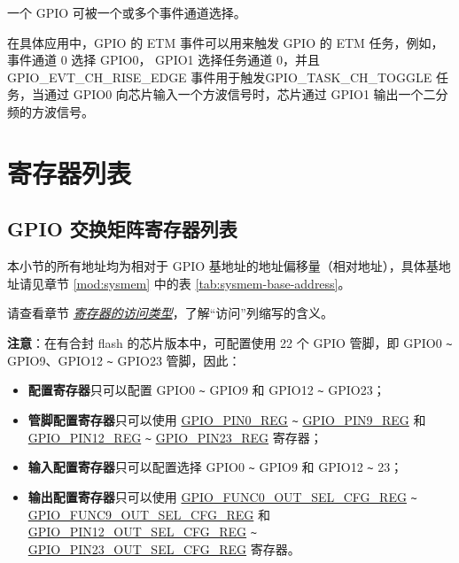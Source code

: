 \documentclass[main\_\_CN.tex]{subfiles}
\begin{document}
\begin{tiplisting}
一个 GPIO 可被一个或多个事件通道选择。
\end{tiplisting}

在具体应用中，GPIO 的 ETM 事件可以用来触发 GPIO 的 ETM 任务，例如，事件通道 0 选择 GPIO0， GPIO1 选择任务通道 0，并且 GPIO\_EVT\_CH\_RISE\_EDGE 事件用于触发GPIO\_TASK\_CH\_TOGGLE 任务，当通过 GPIO0 向芯片输入一个方波信号时，芯片通过 GPIO1 输出一个二分频的方波信号。












\hypertarget{iomuxgpio-reg-summ}{}
\section{寄存器列表}
\subsection{GPIO 交换矩阵寄存器列表}
本小节的所有地址均为相对于 GPIO 基地址的地址偏移量（相对地址），具体基地址请见章节 \ref{mod:sysmem} \textit{} 中的表 \ref{tab:sysmem-base-address}。

请查看章节 \hyperref[glossary-access-types]{\textit{寄存器的访问类型}}，了解“访问”列缩写的含义。


\textbf{注意}：在有合封 flash 的芯片版本中，可配置使用 22 个 GPIO 管脚，即 GPIO0 \verb+~+ GPIO9、GPIO12 \verb+~+ GPIO23 管脚，因此：
\begin{itemize}
    \item \textbf{配置寄存器}只可以配置 GPIO0 \verb+~+ GPIO9 和 GPIO12 \verb+~+ GPIO23；
    \item \textbf{管脚配置寄存器}只可以使用 \hyperref[regdesc:GPIOPINNREG]{GPIO\_PIN0\_REG} \verb+~+ \hyperref[regdesc:GPIOPINNREG]{GPIO\_PIN9\_REG} 和 \hyperref[regdesc:GPIOPINNREG]{GPIO\_PIN12\_REG} \verb+~+ \hyperref[regdesc:GPIOPINNREG]{GPIO\_PIN23\_REG} 寄存器；
    \item \textbf{输入配置寄存器}只可以配置选择 GPIO0 \verb+~+ GPIO9 和 GPIO12 \verb+~+ 23；
    \item \textbf{输出配置寄存器}只可以使用 \hyperref[regdesc:GPIOFUNCNOUTSELCFGREG]{GPIO\_FUNC0\_OUT\_SEL\_CFG\_REG} \verb+~+ \hyperref[regdesc:GPIOFUNCNOUTSELCFGREG]{GPIO\_FUNC9\_OUT\_SEL\_CFG\_REG} 和 \hyperref[regdesc:GPIOFUNCNOUTSELCFGREG]{GPIO\_PIN12\_OUT\_SEL\_CFG\_REG} \verb+~+ \hyperref[regdesc:GPIOFUNCNOUTSELCFGREG]{GPIO\_PIN23\_OUT\_SEL\_CFG\_REG} 寄存器。
\end{itemize}
\end{document}
